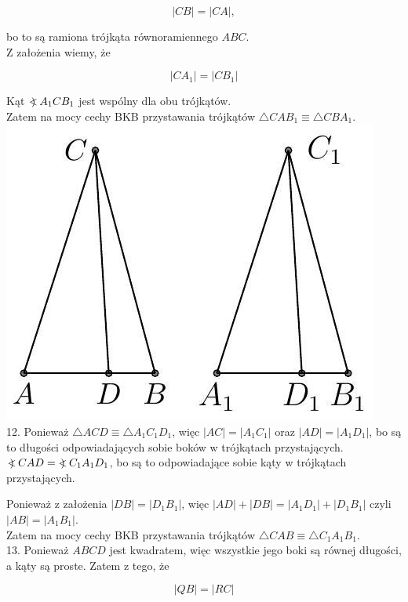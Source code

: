 \documentclass[10pt]{article}
\newcommand\Varangle{\mathop{{<\!\!\!\!\!\text{\small)}}\:}\nolimits}
\begin{document}
\[
|C B|=|C A|,
\]

bo to są ramiona trójkąta równoramiennego \(A B C\).\\
Z założenia wiemy, że

\[
\left|C A_{1}\right|=\left|C B_{1}\right|
\]

Kąt \(\Varangle A_{1} C B_{1}\) jest wspólny dla obu trójkątów.\\
Zatem na mocy cechy BKB przystawania trójkątów \(\triangle C A B_{1} \equiv \triangle C B A_{1}\).\\
\includegraphics[max width=\textwidth, center]{2024_11_21_71f62bd117d375398909g-061(2)}\\
12. Ponieważ \(\triangle A C D \equiv \triangle A_{1} C_{1} D_{1}\), więc \(|A C|=\left|A_{1} C_{1}\right|\) oraz \(|A D|=\left|A_{1} D_{1}\right|\), bo są to długości odpowiadających sobie boków w trójkątach przystających. \(\Varangle C A D=\Varangle C_{1} A_{1} D_{1}\), bo są to odpowiadające sobie kąty w trójkątach przystających.

Ponieważ z założenia \(|D B|=\left|D_{1} B_{1}\right|\), więc \(|A D|+|D B|=\left|A_{1} D_{1}\right|+\left|D_{1} B_{1}\right|\) czyli \(|A B|=\left|A_{1} B_{1}\right|\).\\
Zatem na mocy cechy BKB przystawania trójkątów \(\triangle C A B \equiv \triangle C_{1} A_{1} B_{1}\).\\
13. Ponieważ \(A B C D\) jest kwadratem, więc wszystkie jego boki są równej długości, a kąty są proste. Zatem z tego, że

\[
|Q B|=|R C|
\]
\end{document}
